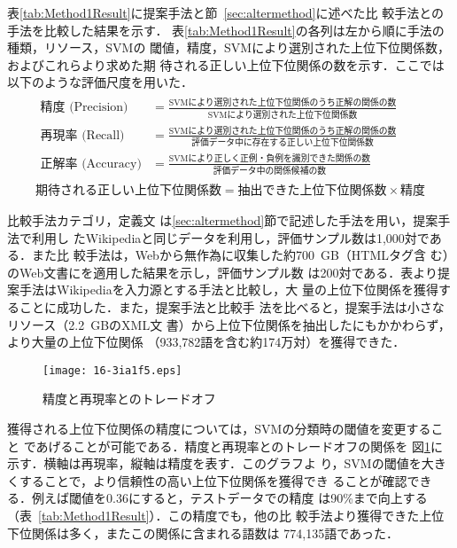 \documentclass[japanese]{jnlp_1.4}
\begin{document}
表\ref{tab:Method1Result}に提案手法と節~\ref{sec:altermethod}に述べた比
較手法と\cite{Sumida_2006}の手法を比較した結果を示す．
表\ref{tab:Method1Result}の各列は左から順に手法の種類，リソース，SVMの
閾値，精度，SVMにより選別された上位下位関係数，およびこれらより求めた期
待される正しい上位下位関係の数を示す．{ここでは以下のような評価尺度を用いた．}
{\allowdisplaybreaks
\begin{gather*}
\begin{split}
\mbox{精度 (Precision) } & = \frac{\mbox{SVMにより選別された上位下位関係のうち正解の関係の数}}{\mbox{SVMにより選別された上位下位関係数}}\\[0.5zw]
\mbox{再現率 (Recall)} & =  \frac{\mbox{SVMにより選別された上位下位関係のうち正解の関係の数}}{\mbox{評価データ中に存在する正しい上位下位関係数}}\\[0.5zw]
\mbox{正解率 (Accuracy)} & =  \frac{\mbox{SVMにより正しく正例・負例を識別できた関係の数}}{\mbox{評価データ中の関係候補の数}}
\end{split}\\
\mbox{期待される正しい上位下位関係数} = \mbox{抽出できた上位下位関係数} \times \mbox{精度}    
\end{gather*}
}

比較手法カテゴリ，定義文
は\ref{sec:altermethod}節で記述した手法を用い，提案手法で利用し
たWikipediaと同じデータを利用し，評価サンプル数は1,000対である．また比
較手法\cite{Sumida_2006}は，Webから無作為に収集した約700~GB（HTMLタグ含
む）のWeb文書に\cite{Sumida_2006}を適用した結果を示し，評価サンプル数
は200対である．表より提案手法はWikipediaを入力源とする手法と比較し，大
量の上位下位関係を獲得することに成功した．また，提案手法と比較手
法\cite{Sumida_2006}を比べると，提案手法は小さなリソース（2.2~GBのXML文
書）から上位下位関係を抽出したにもかかわらず，より大量の上位下位関係
（933,782語を含む約174万対）を獲得できた．

\begin{figure}[b]
\begin{center}
\texttt{[image: 16-3ia1f5.eps]}
\end{center}
    \caption{精度と再現率とのトレードオフ}
    \label{fig:rp}
\end{figure}

獲得される上位下位関係の精度については，SVMの分類時の閾値を変更すること
であげることが可能である．精度と再現率とのトレードオフの関係を
図\ref{fig:rp}に示す．横軸は再現率，縦軸は精度を表す．このグラフよ
り，SVMの閾値を大きくすることで，より信頼性の高い上位下位関係を獲得でき
ることが確認できる．例えば閾値を0.36にすると，テストデータでの精度
は90\%まで向上する（表~\ref{tab:Method1Result}）．この精度でも，他の比
較手法より獲得できた上位下位関係は多く，またこの関係に含まれる語数は
774,135語であった．
\end{document}
